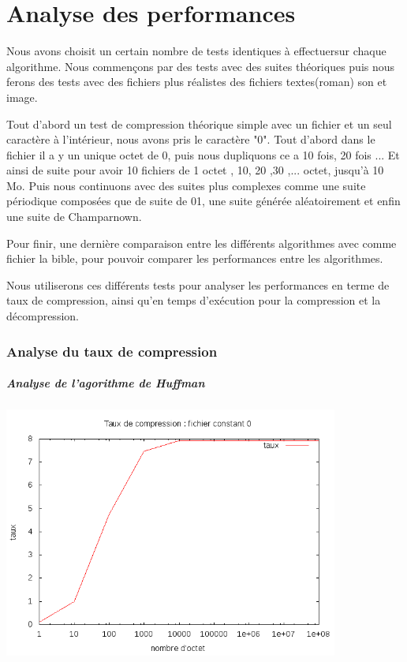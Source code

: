 \documentclass{report}
\begin{document}
\part*{Analyse des performances}
Nous avons choisit un certain nombre de tests identiques à effectuersur chaque algorithme. Nous commençons par des tests avec des suites théoriques puis nous ferons des tests avec des fichiers plus réalistes des fichiers textes(roman) son et image.
 
Tout d'abord un test de compression théorique simple avec un fichier et un seul caractère à l'intérieur, nous avons pris le caractère "0".
Tout d'abord dans le fichier il a y un unique octet de 0, puis nous dupliquons ce a 10 fois, 20 fois ... Et ainsi de suite pour avoir 10 fichiers de 1 octet , 10, 20 ,30 ,...  octet, jusqu'à 10 Mo.
Puis nous continuons avec des suites plus complexes comme une suite périodique composées que de suite de 01, une suite générée aléatoirement et enfin une suite de Champarnown.  

Pour finir, une dernière comparaison entre les différents algorithmes avec comme fichier la bible, pour pouvoir comparer les performances entre les algorithmes.

Nous utiliserons ces différents tests pour analyser les performances en terme de taux de compression, ainsi qu'en temps d’exécution pour la compression et la décompression. 
\section*{Analyse du taux de compression}
\subsubsection{ Analyse de l'agorithme de Huffman}

\begin{center}
\includegraphics[width=11cm]{HConstant.png}
\end{center}
\end{document}
